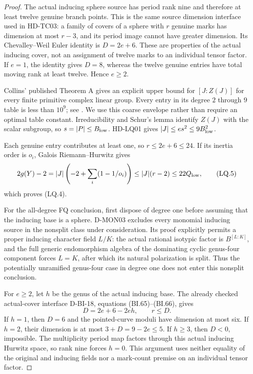 \begin{proof}
The actual inducing sphere source has period rank nine and therefore
at least twelve genuine branch points. This is the same source
dimension interface used in HD-TC03: a family of covers of a sphere
with \(r\) genuine marks has dimension at most \(r-3\), and its
period image cannot have greater dimension. Its Chevalley--Weil
Euler identity is \(D=2e+6\).
These are properties of the actual inducing cover, not an assignment
of twelve marks to an individual tensor factor.
If \(e=1\), the identity gives \(D=8\), whereas the twelve genuine
entries have total moving rank at least twelve. Hence \(e\ge2\).

Collins' published Theorem A gives an explicit upper bound for
\([J:Z(J)]\) for every finite primitive complex linear group.
Every entry in its degree \(2\) through \(9\) table is less than
\(10^9\); see \cite[Theorem A, p.~761]{LQ:Collins2008}.
We use this coarse envelope rather than require an optimal table
constant. Irreducibility and Schur's lemma identify \(Z(J)\)
with the scalar subgroup, so \(s=|P|\le B_{\rm low}\).
HD-LQ01 gives \(|J|\le e s^2\le9B_{\rm low}^2\).

Each genuine entry contributes at least one, so
\(r\le2e+6\le24\). If its inertia order is \(o_i\), Galois
Riemann--Hurwitz gives
\[
 2g(Y)-2=|J|\left(-2+\sum_i(1-1/o_i)\right)
       \le |J|(r-2)\le22Q_{\rm low},
 \tag{LQ.5}
\]
which proves (LQ.4).

For the all-degree FQ conclusion, first dispose of degree one
before assuming that the inducing base is a sphere.
D-MON03 excludes every monomial inducing source in the nonsplit
class under consideration. Its proof explicitly permits a proper
inducing character field \(L/K\): the actual rational isotypic
factor is \(B^{[L:K]}\), and the full generic endomorphism algebra
of the dominating cyclic genus-four component forces \(L=K\),
after which its natural polarization is split.
Thus the potentially unramified genus-four case in degree one
does not enter this nonsplit conclusion.

For \(e\ge2\), let \(h\) be the genus of the actual inducing base.
The already checked actual-cover interface D-BI-18, equations
(BI.65)--(BI.66), gives
\[
 D=2e+6-2eh,\qquad r\le D.
 \tag{LQ.6}
\]
If \(h=1\), then \(D=6\) and the pointed-curve moduli have
dimension at most six. If \(h=2\), their dimension is at most
\(3+D=9-2e\le5\). If \(h\ge3\), then \(D<0\), impossible.
The multiplicity period map factors through this actual inducing
Hurwitz space, so rank nine forces \(h=0\).
This argument uses neither equality of the original and inducing
fields nor a mark-count premise on an individual tensor factor.


\end{proof}
